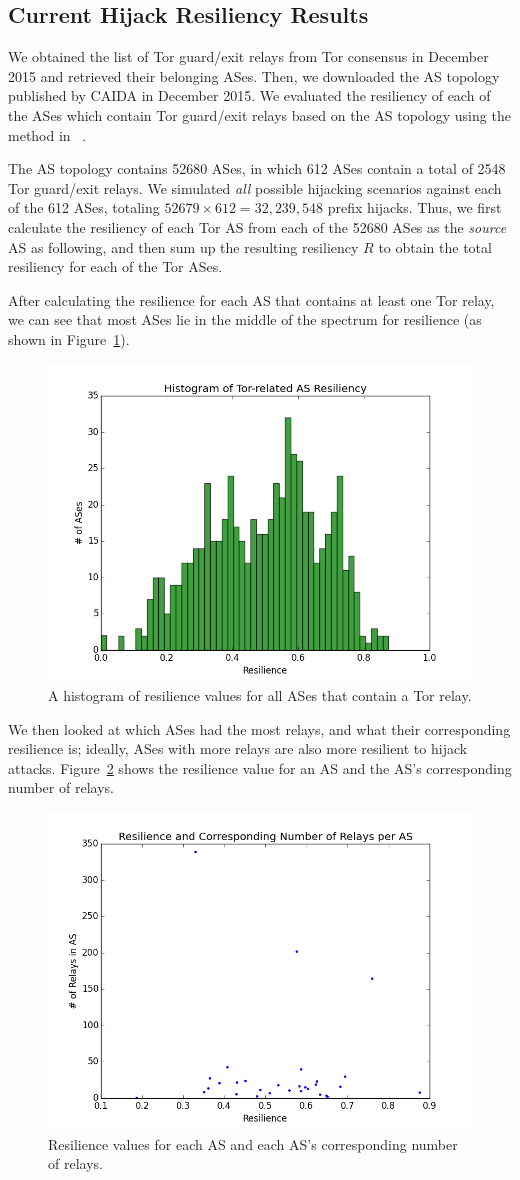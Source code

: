 \subsection{Current Hijack Resiliency Results}

We obtained the list of Tor guard/exit relays from Tor consensus in December 2015 and retrieved their belonging ASes. Then, we downloaded the AS topology published by CAIDA in December 2015. We evaluated the resiliency of each of the ASes which contain Tor guard/exit relays based on the AS topology using the method in ~\cite{lad2007understanding}. 

The AS topology contains 52680 ASes, in which 612 ASes contain a total of 2548 Tor guard/exit relays. We simulated \emph{all} possible hijacking scenarios against each of the 612 ASes, totaling $52679 \times 612 = 32,239,548$ prefix hijacks. Thus, we first calculate the resiliency of each Tor AS from each of the 52680 ASes as the \emph{source} AS as following, and then sum up the resulting resiliency $R$ to obtain the total resiliency for each of the Tor ASes. 

After calculating the resilience for each AS that contains at least one Tor relay, we can see that most ASes lie in the middle of the spectrum for resilience (as shown in Figure~\ref{fig:resilience_histogram}).

\begin{figure}
\centering
\includegraphics[width=.5\textwidth]{resilience_histogram}
\caption{A histogram of resilience values for all ASes that contain a Tor relay.}
\label{fig:resilience_histogram}
\end{figure}

We then looked at which ASes had the most relays, and what their corresponding resilience is; ideally, ASes with more relays are also more resilient to hijack attacks.  Figure~\ref{fig:res_relays} shows the resilience value for an AS and the AS's corresponding number of relays.  

\begin{figure}
\centering
\includegraphics[width=.5\textwidth]{res_num_relays}
\caption{Resilience values for each AS and each AS's corresponding number of relays.}
\label{fig:res_relays}
\end{figure}

